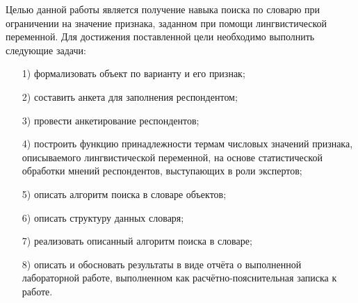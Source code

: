

Целью данной работы является получение навыка поиска по словарю при ограничении на значение признака, заданном при помощи лингвистической переменной.
Для достижения поставленной цели необходимо выполнить следующие задачи:
\begin{enumerate}[itemindent=1em]
	\item[1)] формализовать объект по варианту и его признак;
	\item[2)] составить анкета для заполнения респондентом;
	\item[3)] провести анкетирование респондентов;
	\item[4)] построить функцию принадлежности термам числовых значений признака, описываемого лингвистической переменной, на основе статистической обработки мнений респондентов, выступающих в роли экспертов;
	\item[5)] описать алгоритм поиска в словаре объектов;
	\item[6)] описать структуру данных словаря;
	\item[7)] реализовать описанный алгоритм поиска в словаре;
	\item[8)] описать и обосновать результаты в виде отчёта о выполненной лабораторной работе, выполненном как расчётно-пояснительная записка к работе.
\end{enumerate}
\newpage
